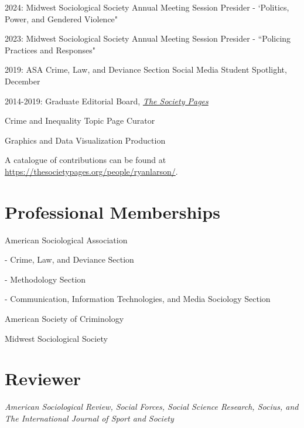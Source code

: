 \documentclass[letterpaper]{article}
\renewenvironment{itemize}{
  \begin{list}{}{
    \setlength{\leftmargin}{1.5em}
  }
}{
  \end{list}
}
\begin{document}
\begin{itemize}

\item 2024: Midwest Sociological Society Annual Meeting Session Presider - `Politics, Power, and Gendered Violence"

\item 2023: Midwest Sociological Society Annual Meeting Session Presider - ``Policing Practices and Responses"

\item 2019: ASA Crime, Law, and Deviance Section Social Media Student Spotlight, December

\item  2014-2019:  Graduate Editorial Board, \href{http://thesocietypages.org/}{\textit{The Society Pages}}
\begin{itemize}
\item Crime and Inequality Topic Page Curator
\item Graphics and Data Visualization Production
\item A catalogue of contributions can be found at \href{https://thesocietypages.org/people/ryanlarson/}{https://thesocietypages.org/people/ryanlarson/}.
\end{itemize}

\end{itemize}


\section*{\textbf{Professional Memberships}}
\begin{itemize}

\item American Sociological Association
\begin{itemize}
\item - Crime, Law, and Deviance Section
\item - Methodology Section
\item - Communication, Information Technologies, and Media Sociology Section
\end{itemize}
\item American Society of Criminology
\item Midwest Sociological Society

\end{itemize}

\section*{\textbf{Reviewer}}

\textit{American Sociological Review, Social Forces, Social Science Research, Socius, and The International Journal of Sport and Society}
\end{document}
